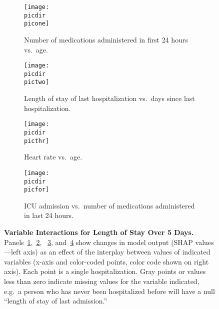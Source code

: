\begin{figure}
\begin{adjustbox}{minipage=7.0in,frame}
\vspace{2.5mm}
\centering
%
\def\picdir{supplementary/los5d/}
%
\def\labbig{fig:los5dint}
%
\def\picone{los5d_SHAP_dependence_2.pdf}
\def\pictwo{los5d_SHAP_dependence_3.pdf}
\def\picthr{los5d_SHAP_dependence_9.pdf}
\def\picfor{los5d_SHAP_dependence_9a.pdf}
\def\capone{Number of medications administered in first 24 hours vs.\ age.}
\def\labone{fig:los5dintagemeds}
\def\captwo{Length of stay of last hospitalization vs.\ days since last hospitalization.}
\def\labtwo{fig:los5dintlostimesince}
\def\capthr{Heart rate vs.\ age.}
\def\labthr{fig:los5dinthrage}
\def\capfor{ICU admission vs.\ number of medications administered in last 24 hours.}
\def\labfor{fig:los5dinticumeds}
%
\def\capbig{\textbf{Variable Interactions for Length of Stay Over 5 Days.} \\ %
Panels~\ref{\labone},~\ref{\labtwo}, %
~\ref{\labthr}, and~\ref{\labfor} %
show changes in model output (SHAP values---left axis) %
as an effect of the interplay between %
values of indicated variables (x-axis and color-coded points, %
color code shown on right axis).\@
Each point is a single hospitalization.\@
Gray points or values less than zero indicate missing values for the variable indicated,
e.g.\ a person who has never been hospitalized before %
will have a null ``length of stay of last admission.''\@
}
%
%
\begin{subfigure}[t]{.45\linewidth}
    \centering
    \captionsetup[subfigure]{}
    \caption{\capone{}}\label{\labone}
    \texttt{[image: \\picdir\\picone]}
\end{subfigure}%
\hspace{5mm}%
\begin{subfigure}[t]{.45\linewidth}
    \centering
    \captionsetup[subfigure]{}
    \caption{\captwo}\label{\labtwo}
    \texttt{[image: \\picdir\\pictwo]}
\end{subfigure}%

\vspace{5mm}
\begin{subfigure}[t]{.45\linewidth}
    \centering
    \captionsetup[subfigure]{}
    \caption{\capthr}\label{\labthr}
    \texttt{[image: \\picdir\\picthr]}
\end{subfigure}%
\hspace{5mm}%
\begin{subfigure}[t]{.45\linewidth}
    \centering
    \captionsetup[subfigure]{}
    \caption{\capfor}\label{\labfor}
    \texttt{[image: \\picdir\\picfor]}
\end{subfigure}%

\caption{\capbig}\label{\labbig}
\end{adjustbox}
\end{figure}
